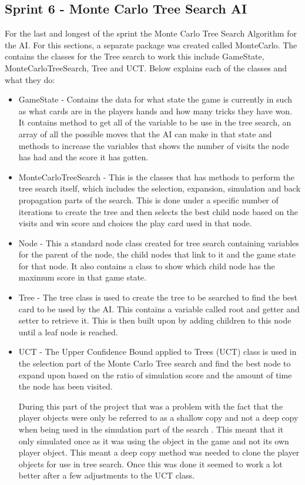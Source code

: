 \subsection{Sprint 6 - Monte Carlo Tree Search AI}
For the last and longest of the sprint the Monte Carlo Tree Search Algorithm for the AI. For this sections, a separate package was created called MonteCarlo. The contains the classes for the Tree search to work this include GameState, MonteCarloTreeSearch, Tree and UCT. Below explains each of the classes and what they do:
\begin{itemize}
\item GameState - Contains the data for what state the game is currently in such as what cards are in the players hands and how many tricks they have won. It contains method to get all of the variable to be use in the tree search, an array of all the possible moves that the AI can make in that state and methods to increase the variables that shows the number of visits the node has had and the score it has gotten.
\item MonteCarloTreeSearch - This is the classes that has methods to perform the tree search itself, which includes the selection, expansion, simulation and back propagation parts of the search. This is done under a specific number of iterations to create the tree and then selects the best child node based on the visits and win score and choices the play card used in that node. 
\item Node - This a standard node class created for tree search containing variables for the parent of the node, the child nodes that link to it and the game state for that node. It also contains a class to show which child node has the maximum score in that game state.
\item Tree - The tree class is used to create the tree to be searched to find the best card to be used by the AI. This contains a variable called root and getter and setter to retrieve it. This is then built upon by adding children to this node until a leaf node is reached.
\item UCT - The Upper Confidence Bound applied to Trees (UCT) class is used in the selection part of the Monte Carlo Tree search and find the best node to expand upon based on the ratio of simulation score and the amount of time the node has been visited.

During this part of the project that was a problem with the fact that the player objects were only be referred to as a shallow copy and not a deep copy when being used in the simulation part of the search \cite{copy}. This meant that it only simulated once as it was using the object in the game and not its own player object. This meant a deep copy method was needed to clone the player objects for use in tree search. Once this was done it seemed to work a lot better after a few adjustments to the UCT class.
\end{itemize}
